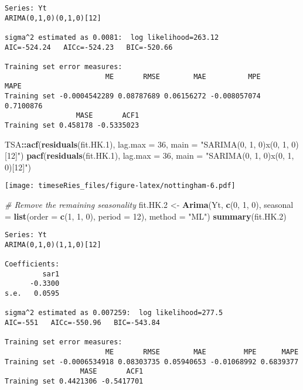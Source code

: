 \documentclass[]{book}
\newenvironment{Shaded}{\begin{snugshade}}{\end{snugshade}}
\newcommand{\CommentTok}[1]{\textcolor[rgb]{0.56,0.35,0.01}{\textit{#1}}}
\newcommand{\DataTypeTok}[1]{\textcolor[rgb]{0.13,0.29,0.53}{#1}}
\newcommand{\DecValTok}[1]{\textcolor[rgb]{0.00,0.00,0.81}{#1}}
\newcommand{\FloatTok}[1]{\textcolor[rgb]{0.00,0.00,0.81}{#1}}
\newcommand{\KeywordTok}[1]{\textcolor[rgb]{0.13,0.29,0.53}{\textbf{#1}}}
\newcommand{\NormalTok}[1]{#1}
\newcommand{\OperatorTok}[1]{\textcolor[rgb]{0.81,0.36,0.00}{\textbf{#1}}}
\newcommand{\StringTok}[1]{\textcolor[rgb]{0.31,0.60,0.02}{#1}}
\begin{document}
\begin{verbatim}
Series: Yt 
ARIMA(0,1,0)(0,1,0)[12] 

sigma^2 estimated as 0.0081:  log likelihood=263.12
AIC=-524.24   AICc=-524.23   BIC=-520.66

Training set error measures:
                        ME       RMSE        MAE          MPE      MAPE
Training set -0.0004542289 0.08787689 0.06156272 -0.008057074 0.7100876
                 MASE       ACF1
Training set 0.458178 -0.5335023
\end{verbatim}

\begin{Shaded}
\begin{Highlighting}[]
\NormalTok{TSA}\OperatorTok{::}\KeywordTok{acf}\NormalTok{(}\KeywordTok{residuals}\NormalTok{(fit.HK}\FloatTok{.1}\NormalTok{), }\DataTypeTok{lag.max =} \DecValTok{36}\NormalTok{, }\DataTypeTok{main =} \StringTok{"SARIMA(0, 1, 0)x(0, 1, 0)[12]"}\NormalTok{)}
\KeywordTok{pacf}\NormalTok{(}\KeywordTok{residuals}\NormalTok{(fit.HK}\FloatTok{.1}\NormalTok{), }\DataTypeTok{lag.max =} \DecValTok{36}\NormalTok{, }\DataTypeTok{main =} \StringTok{"SARIMA(0, 1, 0)x(0, 1, 0)[12]"}\NormalTok{)}
\end{Highlighting}
\end{Shaded}

\texttt{[image: timeseRies\_files/figure-latex/nottingham-6.pdf]}

\begin{Shaded}
\begin{Highlighting}[]
\CommentTok{# Remove the remaining seasonality}
\NormalTok{fit.HK}\FloatTok{.2}\NormalTok{ <-}\StringTok{ }\KeywordTok{Arima}\NormalTok{(Yt, }\KeywordTok{c}\NormalTok{(}\DecValTok{0}\NormalTok{, }\DecValTok{1}\NormalTok{, }\DecValTok{0}\NormalTok{), }\DataTypeTok{seasonal =} \KeywordTok{list}\NormalTok{(}\DataTypeTok{order =} \KeywordTok{c}\NormalTok{(}\DecValTok{1}\NormalTok{, }\DecValTok{1}\NormalTok{, }\DecValTok{0}\NormalTok{), }\DataTypeTok{period =} \DecValTok{12}\NormalTok{), }
    \DataTypeTok{method =} \StringTok{"ML"}\NormalTok{)}
\KeywordTok{summary}\NormalTok{(fit.HK}\FloatTok{.2}\NormalTok{)}
\end{Highlighting}
\end{Shaded}

\begin{verbatim}
Series: Yt 
ARIMA(0,1,0)(1,1,0)[12] 

Coefficients:
         sar1
      -0.3300
s.e.   0.0595

sigma^2 estimated as 0.007259:  log likelihood=277.5
AIC=-551   AICc=-550.96   BIC=-543.84

Training set error measures:
                        ME       RMSE        MAE         MPE      MAPE
Training set -0.0006534918 0.08303735 0.05940653 -0.01068992 0.6839377
                  MASE       ACF1
Training set 0.4421306 -0.5417701
\end{verbatim}
\end{document}
